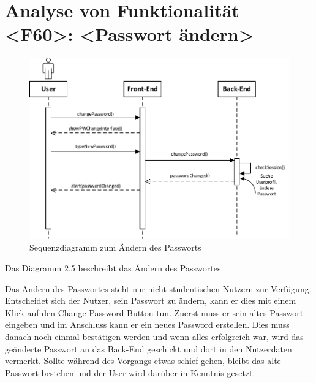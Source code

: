 \section{Analyse von Funktionalität <F60>: <Passwort ändern>}
\begin{figure}[h]
\centering
\includegraphics[width=1.3\textwidth]{figures/sequenz_F60.pdf}
\caption{Sequenzdiagramm zum Ändern des Passworts}
\label{sequence}
\end{figure}
Das Diagramm 2.5 beschreibt das Ändern des Passwortes.

Das Ändern des Passwortes steht nur nicht-studentischen Nutzern zur Verfügung.
Entscheidet sich der Nutzer, sein Passwort zu ändern, kann er dies mit einem Klick auf den Change Password Button tun. Zuerst muss er sein altes Passwort eingeben und im Anschluss kann er ein neues Password erstellen. Dies muss danach noch einmal bestätigen werden und wenn alles erfolgreich war, wird das geänderte Passwort an das Back-End geschickt und dort in den Nutzerdaten vermerkt. Sollte während des Vorgangs etwas schief gehen, bleibt das alte Passwort bestehen und der User wird darüber in Kenntnis gesetzt.

\newpage
